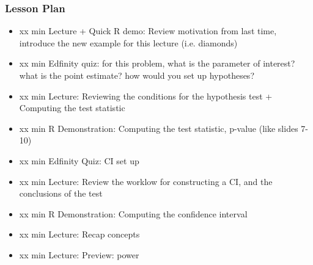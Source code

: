 \begin{frame}
    \frametitle{Lesson Plan}
    \begin{itemize}
        \item xx min Lecture + Quick R demo: Review motivation from last time, introduce the new example for this lecture (i.e. diamonds)
        \item xx min Edfinity quiz: for this problem, what is the parameter of interest? what is the point estimate? how would you set up hypotheses?
        \item xx min Lecture: Reviewing the conditions for the hypothesis test + Computing the test statistic
        \item xx min R Demonstration: Computing the test statistic, p-value (like slides 7-10)
        \item xx min Edfinity Quiz: CI set up 
        \item xx min Lecture: Review the worklow for constructing a CI, and the conclusions of the test 
        \item xx min R Demonstration: Computing the confidence interval 
        \item xx min Lecture: Recap concepts 
        \item xx min Lecture: Preview: power
    \end{itemize}
\end{frame}

    
